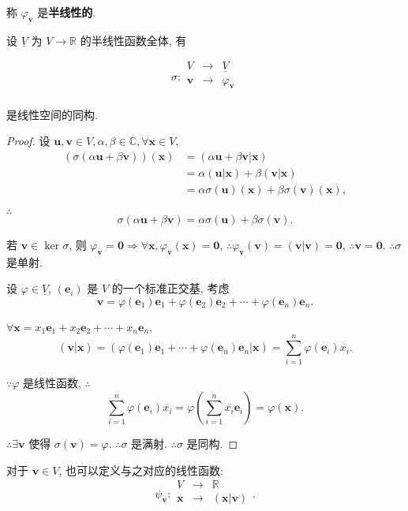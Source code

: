 \documentclass[color=black,device=normal,lang=cn,mode=geye]{elegantnote}
\begin{document}
称 $\varphi_{\boldsymbol{v}}$ 是\textbf{半线性的}.

设 $\underline{V}$ 为 $V\to\mathbb{R}$ 的半线性函数全体, 有
\begin{theorem}\label{t2.2}
    \[\sigma:\begin{array}{rcl}
        V & \to & \underline{V} \\
        \boldsymbol{v} & \to & \varphi_{\boldsymbol{v}} \\
    \end{array}\]

    是线性空间的同构.
\end{theorem}
\begin{proof}
    设 $\boldsymbol{u},\boldsymbol{v}\in V,\alpha,\beta\in\mathbb{C},\forall\boldsymbol{x}\in V$,
    \begin{align*}
        (\sigma(\alpha\boldsymbol{u}+\beta\boldsymbol{v}))(\boldsymbol{x}) & =(\alpha\boldsymbol{u}+\beta\boldsymbol{v}|\boldsymbol{x}) \\
        & =\alpha(\boldsymbol{u}|\boldsymbol{x})+\beta(\boldsymbol{v}|\boldsymbol{x}) \\
        & =\alpha\sigma(\boldsymbol{u})(\boldsymbol{x})+\beta\sigma(\boldsymbol{v})(\boldsymbol{x}),
    \end{align*}

    $\therefore$
    \[\sigma(\alpha\boldsymbol{u}+\beta\boldsymbol{v})=\alpha\sigma(\boldsymbol{u})+\beta\sigma(\boldsymbol{v}).\]

    若 $\boldsymbol{v}\in\ker\sigma$, 则 $\varphi_{\boldsymbol{v}}=\boldsymbol{0}\Rightarrow\forall\boldsymbol{x},\varphi_{\boldsymbol{v}}(\boldsymbol{x})=\boldsymbol{0}$, $\therefore\varphi_{\boldsymbol{v}}(\boldsymbol{v})=(\boldsymbol{v}|\boldsymbol{v})=\boldsymbol{0}$, $\therefore\boldsymbol{v}=\boldsymbol{0}$. $\therefore\sigma$ 是单射.

    设 $\varphi\in\underline{V}$, $(\boldsymbol{e}_i)$ 是 $V$ 的一个标准正交基, 考虑
    \[\boldsymbol{v}=\varphi(\boldsymbol{e}_1)\boldsymbol{e}_1+\varphi(\boldsymbol{e}_2)\boldsymbol{e}_2+\cdots+\varphi(\boldsymbol{e}_n)\boldsymbol{e}_n.\]

    $\forall\boldsymbol{x}=x_1\boldsymbol{e}_1+x_2\boldsymbol{e}_2+\cdots+x_n\boldsymbol{e}_n$,
    \[(\boldsymbol{v}|\boldsymbol{x})=(\varphi(\boldsymbol{e}_1)\boldsymbol{e}_1+\cdots+\varphi(\boldsymbol{e}_n)\boldsymbol{e}_n|\boldsymbol{x})=\sum\limits_{i=1}^n\varphi(\boldsymbol{e}_i)\overline{x_i}.\]

    $\because\varphi$ 是线性函数, $\therefore$
    \[\sum\limits_{i=1}^n\varphi(\boldsymbol{e}_i)\overline{x_i}=\varphi\left(\sum\limits_{i=1}^n\overline{x_i}\boldsymbol{e}_i\right)=\varphi(\boldsymbol{x}).\]

    $\therefore\exists\boldsymbol{v}$ 使得 $\sigma(\boldsymbol{v})=\varphi$. $\therefore\sigma$ 是满射. $\therefore\sigma$ 是同构.
\end{proof}
对于 $\boldsymbol{v}\in V$, 也可以定义与之对应的线性函数:
\[\psi_{\boldsymbol{v}}:\begin{array}{rcl}
    V & \to & \mathbb{R} \\
    \boldsymbol{x} & \to & (\boldsymbol{x}|\boldsymbol{v}) \\
\end{array}.\]
\end{document}
